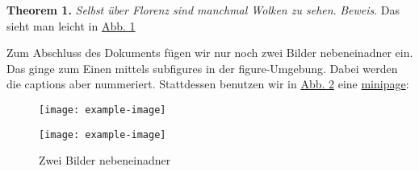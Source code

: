 \documentclass{scrartcl}
\begin{document}
\noindent \textbf{Theorem 1.} \textit{Selbst \"uber Florenz sind manchmal Wolken zu sehen}.
\newline \textit{Beweis}. Das sieht man leicht in \hyperref[abb1]{Abb. 1} 
\newline
\newline

Zum Abschluss des Dokuments f\"ugen wir nur noch zwei Bilder nebeneinadner ein. Das ginge zum Einen mittels subfigures in
der figure-Umgebung. Dabei werden die captions aber nummeriert. Stattdessen benutzen wir in \hyperref[abb2]{Abb. 2} eine
\href{https://www.namsu.de/Extra/befehle/Minipage.html}{minipage}:
\newline

\begin{figure}[h]
\begin{minipage}[c]{0.5\textwidth}
    \texttt{[image: example-image]}
\end{minipage}
\begin{minipage}[c]{0.5\textwidth}
    \texttt{[image: example-image]}
\end{minipage}

\caption{Zwei Bilder nebeneinadner}
\label{abb2}
\end{figure}

\listoftables

\listoffigures

%
\end{document}
